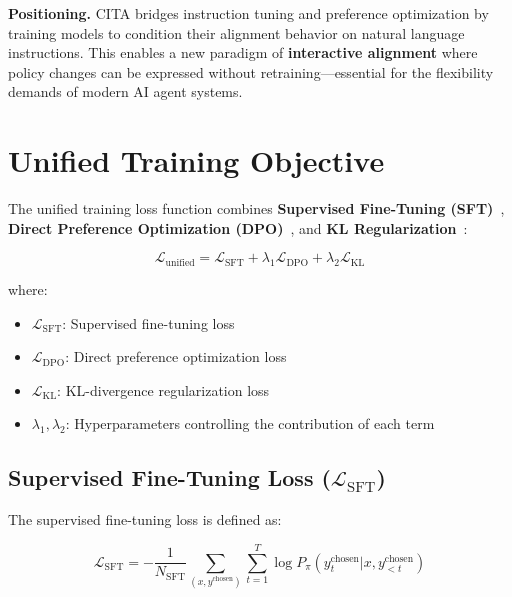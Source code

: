 \textbf{Positioning.} CITA bridges instruction tuning and preference optimization by training models to condition their alignment behavior on natural language instructions. This enables a new paradigm of \textbf{interactive alignment} where policy changes can be expressed without retraining---essential for the flexibility demands of modern AI agent systems.


\section{Unified Training Objective}
\label{sec:appendix_unified}

The unified training loss function combines \textbf{Supervised Fine-Tuning (SFT)}~\cite{wei2022finetuned}, \textbf{Direct Preference Optimization (DPO)}~\cite{rafailov2023direct}, and \textbf{KL Regularization}~\cite{schulman2017proximal,korbak2022rl}:

\begin{equation}
\mathcal{L}_{\text{unified}} = \mathcal{L}_{\text{SFT}} + \lambda_1 \mathcal{L}_{\text{DPO}} + \lambda_2 \mathcal{L}_{\text{KL}}
\label{eq:unified_full}
\end{equation}

where:
\begin{itemize}[leftmargin=*,itemsep=1pt]
    \item $\mathcal{L}_{\text{SFT}}$: Supervised fine-tuning loss
    \item $\mathcal{L}_{\text{DPO}}$: Direct preference optimization loss
    \item $\mathcal{L}_{\text{KL}}$: KL-divergence regularization loss
    \item $\lambda_1, \lambda_2$: Hyperparameters controlling the contribution of each term
\end{itemize}

\subsection{Supervised Fine-Tuning Loss ($\mathcal{L}_{\text{SFT}}$)}

The supervised fine-tuning loss is defined as:

\begin{equation}
\mathcal{L}_{\text{SFT}} = -\frac{1}{N_{\text{SFT}}} \sum_{(x, y^{\text{chosen}})} \sum_{t=1}^{T} \log P_\pi(y_t^{\text{chosen}} | x, y_{<t}^{\text{chosen}})
\label{eq:sft_full}
\end{equation}

